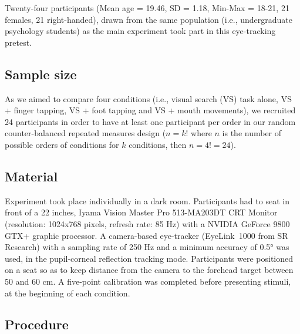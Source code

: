 \documentclass[12pt,]{book}
\theoremstyle{definition}
\theoremstyle{definition}
\theoremstyle{definition}
\theoremstyle{remark}
\begin{document}
Twenty-four participants (Mean age = 19.46, SD = 1.18, Min-Max = 18-21,
21 females, 21 right-handed), drawn from the same population (i.e.,
undergraduate psychology students) as the main experiment took part in
this eye-tracking pretest.

\subsection{Sample size}\label{sample-size}

As we aimed to compare four conditions (i.e., visual search (VS) task
alone, VS + finger tapping, VS + foot tapping and VS + mouth movements),
we recruited 24 participants in order to have at least one participant
per order in our random counter-balanced repeated measures design
(\(n = k!\) where \(n\) is the number of possible orders of conditions
for \(k\) conditions, then \(n =4 != 24\)).

\subsection{Material}\label{material-2}

Experiment took place individually in a dark room. Participants had to
seat in front of a 22 inches, Iyama Vision Master Pro 513-MA203DT CRT
Monitor (resolution: 1024x768 pixels, refresh rate: 85 Hz) with a NVIDIA
GeForce 9800 GTX+ graphic processor. A camera-based eye-tracker
(EyeLink\textregistered~1000 from SR Research) with a sampling rate of
250 Hz and a minimum accuracy of 0.5° was used, in the pupil-corneal
reflection tracking mode. Participants were positioned on a seat so as
to keep distance from the camera to the forehead target between 50 and
60 cm. A five-point calibration was completed before presenting stimuli,
at the beginning of each condition.

\subsection{Procedure}\label{procedure-2}
\end{document}
